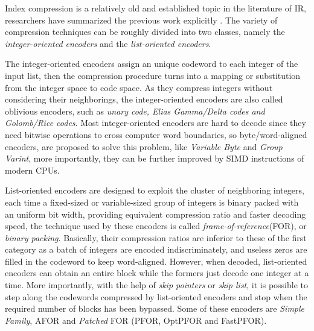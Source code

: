\documentclass{sig-alternate-05-2015}
\begin{document}
Index compression is a relatively old and established topic in the literature of IR, researchers have summarized the previous work explicitly \cite{catena2014inverted,lemire2015decoding,silvestri2010vsencoding,trotman2014compression}.
The variety of compression techniques can be roughly divided into two classes, namely the \textit{integer-oriented encoders} and the \textit{list-oriented encoders}.

The integer-oriented encoders assign an unique codeword to each integer of the input list, then the compression procedure turns into a mapping or substitution from the integer space to code space.
As they compress integers without considering their neighborings, the integer-oriented encoders are also called oblivious encoders\cite{catena2014inverted}, such as \textit{unary code, Elias Gamma/Delta codes \emph{and} Golomb/Rice codes}.
Most integer-oriented encoders are hard to decode since they need bitwise operations to cross computer word boundaries, so byte/word-aligned encoders, are proposed to solve this problem, like \textit{Variable Byte} and \textit{Group Varint}, more importantly, they can be further improved by SIMD instructions of modern CPUs\cite{stepanov2011simd,trotman2014compression}.

List-oriented encoders are designed to exploit the cluster of neighboring integers, each time a fixed-sized or variable-sized group of integers is binary packed with an uniform bit width, providing equivalent compression ratio and faster decoding speed, the technique used by these encoders is called \textit{frame-of-reference}(FOR), or \textit{binary packing}\cite{goldstein1998compressing}.
Basically, their compression ratios are inferior to these of the first category as a batch of integers are encoded indiscriminately, and useless zeros are filled in the codeword to keep word-aligned.
However, when decoded, list-oriented encoders can obtain an entire block while the formers just decode one integer at a time.
More importantly, with the help of \textit{skip pointers} or \textit{skip list}, it is possible to step along the codewords compressed by list-oriented encoders and stop when the required number of blocks has been bypassed.
Some of these encoders are \textit{Simple Family}, AFOR and \textit{Patched} FOR (PFOR, OptPFOR and FastPFOR).

{}
\end{document}
